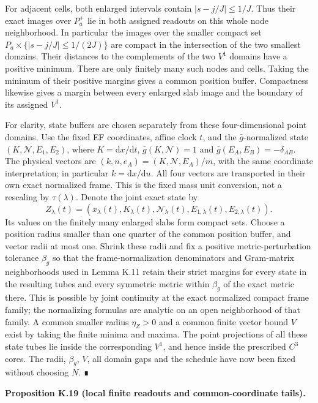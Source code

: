 \documentclass[
  english,
  11pt,
  reqno]{amsart}
\makeatletter
\newcommand{\pandocstatementheading}[1]{%
  \par\addpenalty{\@beginparpenalty}%
  \addvspace{.5\baselineskip plus .2\baselineskip minus .2\baselineskip}%
  {\normalfont\bfseries #1\par}%
  \nobreak\@afterindenttrue\@afterheading
}
\makeatother
\begin{document}
For adjacent cells, both enlarged intervals contain \(|s-j/J|\le1/J\).
Thus their exact images over \(P_a^+\) lie in both assigned readouts on
this whole node neighborhood. In particular the images over the smaller
compact set \(P_a\times\{|s-j/J|\le1/(2J)\}\) are compact in the
intersection of the two smallest domains. Their distances to the
complements of the two \(V^1\) domains have a positive minimum. There
are only finitely many such nodes and cells. Taking the minimum of their
positive margins gives a common position buffer. Compactness likewise
gives a margin between every enlarged slab image and the boundary of its
assigned \(V^1\).

For clarity, state buffers are chosen separately from these
four-dimensional point domains. Use the fixed EF coordinates, affine
clock \(t\), and the \(\bar g\)-normalized state
\((K,\mathcal N,E_1,E_2)\), where \(K=\mathrm dx/\mathrm dt\),
\(\bar g(K,\mathcal N)=1\) and \(\bar g(E_A,E_B)=-\delta_{AB}\). The
physical vectors are \((k,n,e_A)=(K,\mathcal N,E_A)/m\), with the same
coordinate interpretation; in particular \(k=\mathrm dx/\mathrm du\).
All four vectors are transported in their own exact normalized frame.
This is the fixed mass unit conversion, not a rescaling by
\(\tau(\lambda)\). Denote the joint exact state by \[
 Z_\lambda(t)=(x_\lambda(t),K_\lambda(t),
                       \mathcal N_\lambda(t),E_{1,\lambda}(t),E_{2,\lambda}(t)).
\] Its values on the finitely many enlarged slabs form compact sets.
Choose a position radius smaller than one quarter of the common position
buffer, and vector radii at most one. Shrink these radii and fix a
positive metric-perturbation tolerance \(\beta_g\) so that the
frame-normalization denominators and Gram-matrix neighborhoods used in
Lemma K.11 retain their strict margins for every state in the resulting
tubes and every symmetric metric within \(\beta_g\) of the exact metric
there. This is possible by joint continuity at the exact normalized
compact frame family; the normalizing formulas are analytic on an open
neighborhood of that family. A common smaller radius \(\eta_Z>0\) and a
common finite vector bound \(V\) exist by taking the finite minima and
maxima. The point projections of all these state tubes lie inside the
corresponding \(V^1\), and hence inside the prescribed \(C^3\) cores.
The radii, \(\beta_g\), \(V\), all domain gaps and the schedule have now
been fixed without choosing \(N\). ∎

\pandocstatementheading{\protect{}\label{prop:fro-a-finite-readout-tail}Proposition K.19 (local finite readouts and common-coordinate tails).}
\end{document}
